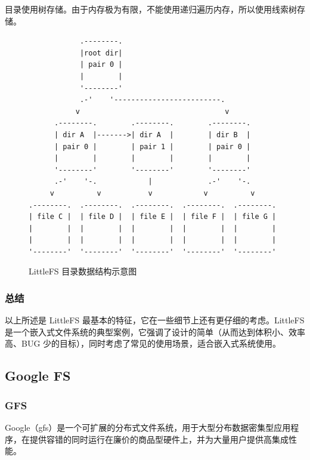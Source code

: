\documentclass{ctexart}
\begin{document}
目录使用树存储。由于内存极为有限，不能使用递归遍历内存，所以使用线索树存储。

\begin{figure}
\begin{verbatim}
            .--------.
            |root dir|
            | pair 0 |
            |        |
            '--------'
            .-'    '-------------------------.
           v                                  v
      .--------.        .--------.        .--------.
      | dir A  |------->| dir A  |        | dir B  |
      | pair 0 |        | pair 1 |        | pair 0 |
      |        |        |        |        |        |
      '--------'        '--------'        '--------'
      .-'    '-.            |             .-'    '-.
     v          v           v            v          v
.--------.  .--------.  .--------.  .--------.  .--------.
| file C |  | file D |  | file E |  | file F |  | file G |
|        |  |        |  |        |  |        |  |        |
|        |  |        |  |        |  |        |  |        |
'--------'  '--------'  '--------'  '--------'  '--------'
\end{verbatim}
\caption{LittleFS 目录数据结构示意图}
\end{figure}

\subsubsection{总结}

以上所述是 LittleFS 最基本的特征，它在一些细节上还有更仔细的考虑。LittleFS 是一个嵌入式文件系统的典型案例，它强调了设计的简单（从而达到体积小、效率高、BUG 少的目标），同时考虑了常见的使用场景，适合嵌入式系统使用。

\subsection{Google FS}
\subsubsection{GFS}
Google（gfs）是一个可扩展的分布式文件系统，用于大型分布数据密集型应用程序，在提供容错的同时运行在廉价的商品型硬件上，并为大量用户提供高集成性能。\cite{GFS}
\end{document}
